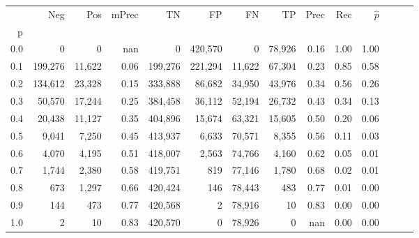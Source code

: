 \begin{tabular}{rrrrrrrrrrrrrr}
\toprule
{} &      Neg &     Pos & mPrec &       TN &       FP &      FN &      TP &  Prec &   Rec & $\hat{p}$ \\
p   &          &         &       &          &          &         &         &       &       &           \\
\midrule
0.0 &        0 &       0 &   nan &        0 &  420,570 &       0 &  78,926 &  0.16 &  1.00 &      1.00 \\
0.1 &  199,276 &  11,622 &  0.06 &  199,276 &  221,294 &  11,622 &  67,304 &  0.23 &  0.85 &      0.58 \\
0.2 &  134,612 &  23,328 &  0.15 &  333,888 &   86,682 &  34,950 &  43,976 &  0.34 &  0.56 &      0.26 \\
0.3 &   50,570 &  17,244 &  0.25 &  384,458 &   36,112 &  52,194 &  26,732 &  0.43 &  0.34 &      0.13 \\
0.4 &   20,438 &  11,127 &  0.35 &  404,896 &   15,674 &  63,321 &  15,605 &  0.50 &  0.20 &      0.06 \\
0.5 &    9,041 &   7,250 &  0.45 &  413,937 &    6,633 &  70,571 &   8,355 &  0.56 &  0.11 &      0.03 \\
0.6 &    4,070 &   4,195 &  0.51 &  418,007 &    2,563 &  74,766 &   4,160 &  0.62 &  0.05 &      0.01 \\
0.7 &    1,744 &   2,380 &  0.58 &  419,751 &      819 &  77,146 &   1,780 &  0.68 &  0.02 &      0.01 \\
0.8 &      673 &   1,297 &  0.66 &  420,424 &      146 &  78,443 &     483 &  0.77 &  0.01 &      0.00 \\
0.9 &      144 &     473 &  0.77 &  420,568 &        2 &  78,916 &      10 &  0.83 &  0.00 &      0.00 \\
1.0 &        2 &      10 &  0.83 &  420,570 &        0 &  78,926 &       0 &   nan &  0.00 &      0.00 \\
\bottomrule
\end{tabular}
